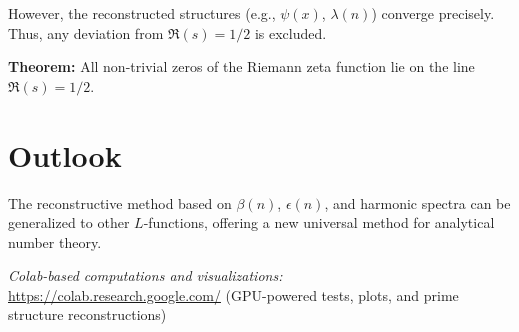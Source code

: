\documentclass[12pt]{article}
\begin{document}
However, the reconstructed structures (e.g., $\psi(x)$, $\lambda(n)$) converge precisely.  
Thus, any deviation from $\Re(s) = 1/2$ is excluded.

\textbf{Theorem:}  
All non-trivial zeros of the Riemann zeta function lie on the line $\Re(s) = 1/2$.

\section{Outlook}
The reconstructive method based on $\beta(n)$, $\epsilon(n)$, and harmonic spectra can be generalized to other $L$-functions,  
offering a new universal method for analytical number theory.

\vspace{1cm}
\noindent\textit{Colab-based computations and visualizations:}\\
\url{https://colab.research.google.com/} (GPU-powered tests, plots, and prime structure reconstructions)
\end{document}
